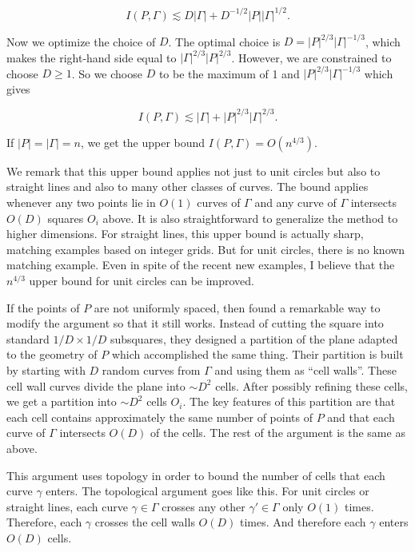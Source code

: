 \documentclass{amsart}
\begin{document}
$$ I(P, \Gamma) \lesssim D |\Gamma| + D^{-1/2} |P| |\Gamma|^{1/2}. $$

Now we optimize the choice of $D$.   The optimal choice is $D = |P|^{2/3} |\Gamma|^{-1/3}$,  which makes the right-hand side equal to $|\Gamma|^{2/3} |P|^{2/3}$.   However, we are constrained to choose $D \ge 1$.   So we choose $D$ to be the maximum of 1 and $|P|^{2/3} |\Gamma|^{-1/3}$  which gives

$$ I(P, \Gamma) \lesssim |\Gamma| + |P|^{2/3} |\Gamma|^{2/3}. $$

If $|P| = |\Gamma| = n$,  we get the upper bound $I(P, \Gamma) = O(n^{4/3})$.  

We remark that this upper bound applies not just to unit circles but also to straight lines and also to many other classes of curves.   The bound applies whenever any two points lie in $O(1)$ curves of $\Gamma$ and any curve of $\Gamma$ intersects $O(D)$ squares $O_i$ above.   It is also straightforward to generalize the method to higher dimensions.   For straight lines,  this upper bound is actually sharp,  matching examples based on integer grids.   But for unit circles,  there is no known matching example.   Even in spite of the recent new examples,  I believe that the $n^{4/3}$ upper bound for unit circles can be improved.

If the points of $P$ are not uniformly spaced,  then \cite{CEGSW} found a remarkable way to modify the argument so that it still works.   Instead of cutting the square into standard $1/D \times 1/D$ subsquares,  they designed a partition of the plane adapted to the geometry of $P$ which accomplished the same thing.   Their partition is built by starting with $D$ random curves from $\Gamma$ and using them as ``cell walls''.   These cell wall curves divide the plane into $\sim D^2$ cells.   After possibly refining these cells,  we get a partition into $\sim D^2$ cells $O_i$.   The key features of this partition are that each cell contains approximately the same number of points of $P$ and that each curve of $\Gamma$ intersects $O(D)$ of the cells.   The rest of the argument is the same as above.

This argument uses topology in order to bound the number of cells that each curve $\gamma$ enters.   The topological argument goes like this.   For unit circles or straight lines,  each curve $\gamma \in \Gamma$ crosses any other $\gamma' \in \Gamma$ only $O(1)$ times.  Therefore,  each $\gamma$ crosses the cell walls $O(D)$ times.   And therefore each $\gamma$ enters $O(D)$ cells.
\end{document}
